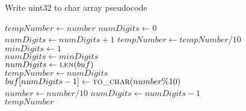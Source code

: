 \documentclass[12pt]{report}
\begin{document}
    \begin{algorithm}
        \caption{Write uint32 to char array pseudocode}
        \label{code:write_uint32}
        \begin{algorithmic}[1]

                \State $tempNumber \gets number$
                \State $numDigits \gets 0$
                \\

                    \State $numDigits \gets numDigits + 1$
                    \State $tempNumber \gets tempNumber / 10$
                \EndWhile\\

                    \State $minDigits \gets 1$
                \EndIf\\

                    \State $numDigits \gets minDigits$
                \EndIf\\

                    \State $numDigits \gets \Call {len}{buf}$
                \EndIf\\

                \State $tempNumber \gets numDigits$\\

                        \State $buf \lbrack numDigits - 1 \rbrack \gets \Call
                            {to\_char}{number \% 10}$
                    \EndIf\\

                    \State $number \gets number / 10$
                    \State $numDigits \gets numDigits - 1$
                \EndWhile\\

                \State \Return $tempNumber$
            \EndFunction
        \end{algorithmic}
    \end{algorithm}
\end{document}
